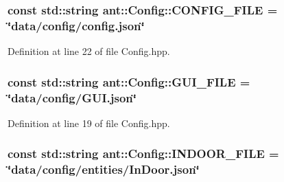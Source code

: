 \hypertarget{classant_1_1_config_ab7eb789f0a5234e6b68cae2581276410}{
\subsubsection[{C\+O\+N\+F\+I\+G\+\_\+\+F\+I\+L\+E}]{\setlength{\rightskip}{0pt plus 5cm}const std\+::string ant\+::\+Config\+::\+C\+O\+N\+F\+I\+G\+\_\+\+F\+I\+L\+E = \char`\"{}data/config/config.\+json\char`\"{}\hspace{0.3cm}{\ttfamily [static]}}}\label{classant_1_1_config_ab7eb789f0a5234e6b68cae2581276410}


Definition at line 22 of file Config.\+hpp.

\hypertarget{classant_1_1_config_a31e1640640b40078981101bae459f467}{
\subsubsection[{G\+U\+I\+\_\+\+F\+I\+L\+E}]{\setlength{\rightskip}{0pt plus 5cm}const std\+::string ant\+::\+Config\+::\+G\+U\+I\+\_\+\+F\+I\+L\+E = \char`\"{}data/config/G\+U\+I.\+json\char`\"{}\hspace{0.3cm}{\ttfamily [static]}}}\label{classant_1_1_config_a31e1640640b40078981101bae459f467}


Definition at line 19 of file Config.\+hpp.

\hypertarget{classant_1_1_config_a8c82f237ce1b827e21ffc8640ee7240d}{
\subsubsection[{I\+N\+D\+O\+O\+R\+\_\+\+F\+I\+L\+E}]{\setlength{\rightskip}{0pt plus 5cm}const std\+::string ant\+::\+Config\+::\+I\+N\+D\+O\+O\+R\+\_\+\+F\+I\+L\+E = \char`\"{}data/config/entities/In\+Door.\+json\char`\"{}\hspace{0.3cm}{\ttfamily [static]}}}\label{classant_1_1_config_a8c82f237ce1b827e21ffc8640ee7240d}


